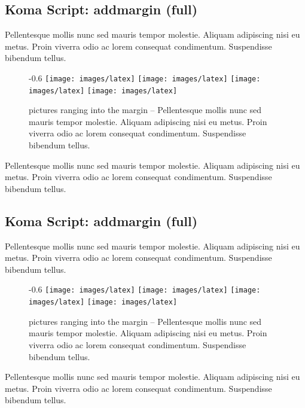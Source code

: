 \documentclass{scrbook}
\providecommand\captionsetup[2][]{}
\newlength\marginwidth
\begin{document}
\subsection{Koma Script: addmargin (full)}
\captionsetup{parboxrestore=full}

Pellentesque mollis nunc sed mauris tempor molestie. Aliquam adipiscing
nisi eu metus. Proin viverra odio ac lorem consequat condimentum.
Suspendisse bibendum tellus.

\begin{figure}[!ht]
\begin{addmargin*}[0pt]{-0.6\marginwidth}%
\centering
\texttt{[image: images/latex]} \hfill
\texttt{[image: images/latex]} \hfill
\texttt{[image: images/latex]} \hfill
\texttt{[image: images/latex]}
\caption{pictures ranging into the margin -- Pellentesque mollis nunc
sed mauris tempor molestie. Aliquam adipiscing nisi eu metus. Proin
viverra odio ac lorem consequat condimentum. Suspendisse bibendum tellus. }
\label{fig:maincls.addmargin}
\end{addmargin*}
\end{figure}
%
Pellentesque mollis nunc sed mauris tempor molestie. Aliquam adipiscing
nisi eu metus. Proin viverra odio ac lorem consequat condimentum.
Suspendisse bibendum tellus.

\clearpage

\subsection{Koma Script: addmargin (full)}
\captionsetup{parboxrestore=full}

Pellentesque mollis nunc sed mauris tempor molestie. Aliquam adipiscing
nisi eu metus. Proin viverra odio ac lorem consequat condimentum.
Suspendisse bibendum tellus.

\begin{figure}[!ht]
\begin{addmargin*}[0pt]{-0.6\marginwidth}%
\centering
\texttt{[image: images/latex]} \hfill
\texttt{[image: images/latex]} \hfill
\texttt{[image: images/latex]} \hfill
\texttt{[image: images/latex]}
\caption{pictures ranging into the margin -- Pellentesque mollis nunc
sed mauris tempor molestie. Aliquam adipiscing nisi eu metus. Proin
viverra odio ac lorem consequat condimentum. Suspendisse bibendum tellus. }
\label{fig:maincls.addmargin2}
\end{addmargin*}
\end{figure}
%
Pellentesque mollis nunc sed mauris tempor molestie. Aliquam adipiscing
nisi eu metus. Proin viverra odio ac lorem consequat condimentum.
Suspendisse bibendum tellus.
\end{document}
